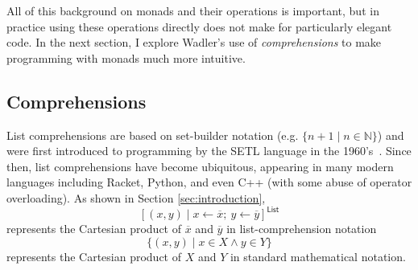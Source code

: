 \documentclass[acmsmall, nonacm, screen]{acmart}
\begin{document}
All of this background on monads and their operations is important, but in practice using these
operations directly does not make for particularly elegant code. In the next section, I explore
Wadler's use of {\em comprehensions} to make programming with monads much more intuitive.

\subsection{Comprehensions}

List comprehensions are based on set-builder notation (e.g. $\{n + 1 \mid n \in \mathbb{N}\}$)
and were first introduced to programming by the SETL language in the
1960's~\cite{schwartz2012programming}. Since then, list comprehensions have become ubiquitous,
appearing in many modern languages including Racket, Python, and even C++ (with some abuse of
operator overloading). As shown in Section \ref{sec:introduction},
\[ [(x, y) \mid x \leftarrow \overline{x};\ y \leftarrow \overline{y}]^{\textsf{List}} \]
represents the Cartesian product of $\overline{x}$ and $\overline{y}$ in list-comprehension notation
\[ \{(x, y) \mid x \in X \wedge y \in Y\} \]
represents the Cartesian product of $X$ and $Y$ in standard mathematical notation.
\end{document}
